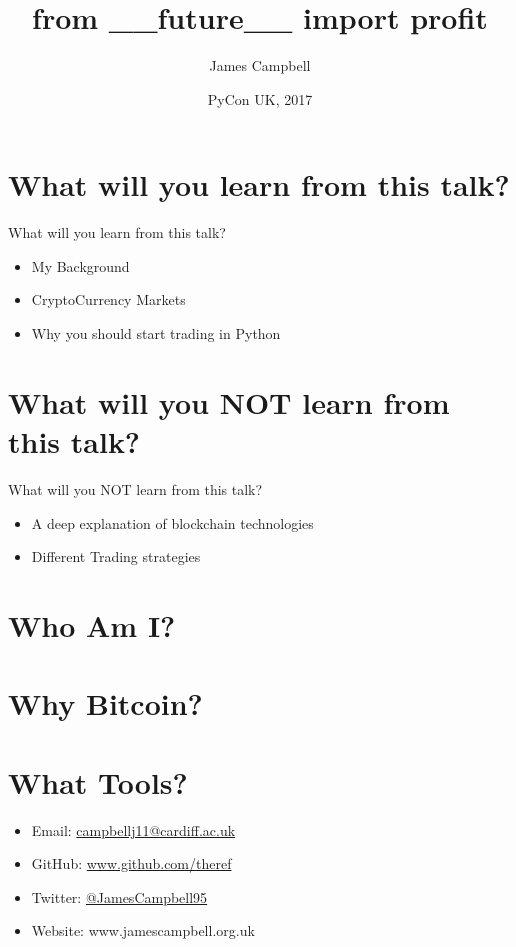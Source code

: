 \documentclass{beamer}
\title{from \_\_future\_\_ import profit}
\author{James Campbell}
\institute[Cardiff University]
  {
  Department of Mathematics\\
  Cardiff University
  }
\date{PyCon UK, 2017}
\begin{document}
\begin{frame}
  \titlepage
\end{frame}

\section{What will you learn from this talk?}

\begin{frame}{What will you learn from this talk?}
  \begin{itemize}
    \item My Background
    \item CryptoCurrency Markets
    \item Why you should start trading in Python
  \end{itemize}
\end{frame}

\section{What will you NOT learn from this talk?}

\begin{frame}{What will you NOT learn from this talk?}
  \begin{itemize}
    \item A deep explanation of blockchain technologies
    \item Different Trading strategies
  \end{itemize}
\end{frame}

\section{Who Am I?}

\section{Why Bitcoin?}

\section{What Tools?}

\begin{frame}[standout]
  \begin{itemize}
    \itemsep2em
    \item Email: \href{mailto:campbellj11@cardiff.ac.uk}{campbellj11@cardiff.ac.uk}

    \item GitHub: \href{https://github.com/theref}{www.github.com/theref}

    \item Twitter: \href{https://twitter.com/JamesCampbell95}{@JamesCampbell95}

    \item Website: www.jamescampbell.org.uk
  \end{itemize}
\end{frame}
\end{document}

